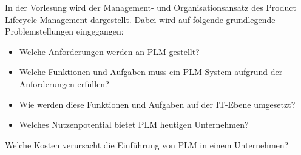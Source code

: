 \begin{module}
\begin{content}
In der Vorlesung wird der Management- und Organisationsansatz des Product Lifecycle Management dargestellt. Dabei wird auf folgende grundlegende Problemstellungen eingegangen:

 \begin{itemize}\item Welche Anforderungen werden an PLM gestellt?  \item Welche Funktionen und Aufgaben muss ein PLM-System aufgrund der Anforderungen erfüllen?  \item Wie werden diese Funktionen und Aufgaben auf der IT-Ebene umgesetzt?  \item Welches Nutzenpotential bietet PLM heutigen Unternehmen?  \end{itemize}

Welche Kosten verursacht die Einführung von PLM in einem Unternehmen?


\end{content}



\end{module}

